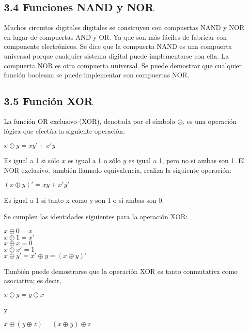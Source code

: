 \subsection*{3.4 Funciones NAND y NOR} Muchos circuitos digitales digitales se
construyen con compuertas NAND y NOR en lugar de compuertas AND y OR. Ya que son
m\'{a}s f\'{a}ciles de fabricar con componente electr\'{o}nicos. Se dice que la
compuerta NAND es una compuerta universal porque cualquier sistema digital puede
implementarse con ella. La compuerta NOR es otra compuerta universal. Se puede
demostrar que cualquier funci\'{o}n booleana se puede implementar con compuertas
NOR.

\subsection*{3.5 Funci\'{o}n XOR} La funci\'{o}n OR exclusivo (XOR), denotada
por el s\'{i}mbolo $\oplus$, es una operaci\'{o}n l\'{o}gica que efect\'{u}a la
siguiente operaci\'{o}n: \begin{center} $x \oplus y = xy' + x'y$ \end{center} Es
igual a 1 si s\'{o}lo $x$ es igual a 1 o s\'{o}lo $y$ es igual a 1, pero no si
ambas son 1. El NOR exclusivo, tambi\'{e}n llamado equivalencia, realiza la
siguiente operaci\'{o}n:

\begin{center} $(x \oplus y)' = xy + x'y'$ \end{center} Es igual a 1 si tanto x
como y son 1 o si ambas son 0.

Se cumplen las identidades siguientes para la operaci\'{o}n XOR: \begin{center}
    $x \oplus 0 = x$ \\ $x \oplus 1 = x'$ \\ $x \oplus x = 0$ \\ $x \oplus x' = 1$
    \\ $x \oplus y' = x' \oplus y = (x \oplus y)' $ \end{center}

Tambi\'{e}n puede demostrarse que la operaci\'{o}n XOR es tanto conmutativa
como asociativa; es decir, \begin{center} $x \oplus y = y \oplus x$ \\
    \begin{flushleft} y \end{flushleft} $x \oplus (y \oplus z) = (x \oplus y) \oplus
        z$ \end{center}


